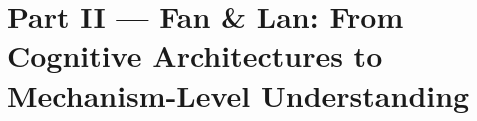\part{Part II — Fan \& Lan: From Cognitive Architectures to Mechanism-Level Understanding}











